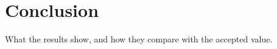 \section{Conclusion}
\label{sec:conclusion}
What the results show, and how they compare with the accepted value.
